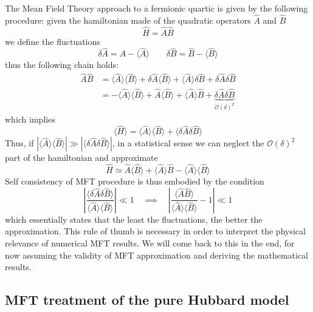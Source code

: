 The Mean Field Theory approach to a fermionic quartic is given by the following procedure: given the hamiltonian made of the quadratic operators $\hat A$ and $\hat B$
\[
\hat H = \hat A \hat B
\]
we define the fluctuations
\[
\delta \hat A = \hat A - \langle \hat A \rangle 
\qquad
\delta \hat B = \hat B - \langle \hat B \rangle
\]
thus the following chain holds:
\[
\begin{aligned}
	\hat A \hat B &= \langle \hat A \rangle \langle \hat B \rangle + \delta \hat A \langle \hat B \rangle + \langle \hat A \rangle \delta \hat B + \delta \hat A \delta \hat B \\
	&= - \langle \hat A \rangle \langle \hat B \rangle + \hat A \langle \hat B \rangle + \langle \hat A \rangle \hat B + \underbrace{
		\delta \hat A \delta \hat B
	}_{\mathcal{O}(\delta)^2}
\end{aligned}
\]
which implies
\[
\langle \hat H \rangle = \langle \hat A \rangle \langle \hat B \rangle + \langle \delta \hat A \delta \hat B \rangle
\]
Thus, if $| \langle \hat A \rangle \langle \hat B \rangle | \gg | \langle \delta \hat A \delta \hat B \rangle |$, in a statistical sense we can neglect the $\mathcal{O}(\delta)^2$ part of the hamiltonian and approximate
\[
\hat H \simeq \hat A \langle \hat B \rangle + \langle \hat A \rangle \hat B - \langle \hat A \rangle \langle \hat B \rangle
\]
Self consistency of MFT procedure is thus embodied by the condition
\begin{equation}\label{eq:mft-global-self-consistency}
	\left| \frac{\langle \delta \hat A \delta \hat B \rangle}{\langle \hat A \rangle \langle \hat B \rangle} \right| \ll 1
	\quad\implies\quad
	\left| \frac{\langle \hat A \hat B \rangle}{\langle \hat A \rangle \langle \hat B \rangle} - 1 \right| \ll 1
\end{equation}
which essentially states that the least the fluctuations, the better the approximation. This rule of thumb is necessary in order to interpret the physical relevance of numerical MFT results. We will come back to this in the end, for now assuming the validity of MFT approximation and deriving the mathematical results.

\subsection{MFT treatment of the pure Hubbard model}\label{subsec-mft-treatment-hm}

